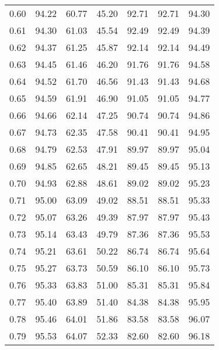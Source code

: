 \begin{tabular}{|c|c|c|c|c|c|c|}
      0.60 &     94.22 &     60.77 &      45.20 &   92.71 &      92.71 &         94.30 \\
      0.61 &     94.30 &     61.03 &      45.54 &   92.49 &      92.49 &         94.39 \\
      0.62 &     94.37 &     61.25 &      45.87 &   92.14 &      92.14 &         94.49 \\
      0.63 &     94.45 &     61.46 &      46.20 &   91.76 &      91.76 &         94.58 \\
      0.64 &     94.52 &     61.70 &      46.56 &   91.43 &      91.43 &         94.68 \\
      0.65 &     94.59 &     61.91 &      46.90 &   91.05 &      91.05 &         94.77 \\
      0.66 &     94.66 &     62.14 &      47.25 &   90.74 &      90.74 &         94.86 \\
      0.67 &     94.73 &     62.35 &      47.58 &   90.41 &      90.41 &         94.95 \\
      0.68 &     94.79 &     62.53 &      47.91 &   89.97 &      89.97 &         95.04 \\
      0.69 &     94.85 &     62.65 &      48.21 &   89.45 &      89.45 &         95.13 \\
      0.70 &     94.93 &     62.88 &      48.61 &   89.02 &      89.02 &         95.23 \\
      0.71 &     95.00 &     63.09 &      49.02 &   88.51 &      88.51 &         95.33 \\
      0.72 &     95.07 &     63.26 &      49.39 &   87.97 &      87.97 &         95.43 \\
      0.73 &     95.14 &     63.43 &      49.79 &   87.36 &      87.36 &         95.53 \\
      0.74 &     95.21 &     63.61 &      50.22 &   86.74 &      86.74 &         95.64 \\
      0.75 &     95.27 &     63.73 &      50.59 &   86.10 &      86.10 &         95.73 \\
      0.76 &     95.33 &     63.83 &      51.00 &   85.31 &      85.31 &         95.84 \\
      0.77 &     95.40 &     63.89 &      51.40 &   84.38 &      84.38 &         95.95 \\
      0.78 &     95.46 &     64.01 &      51.86 &   83.58 &      83.58 &         96.07 \\
      0.79 &     95.53 &     64.07 &      52.33 &   82.60 &      82.60 &         96.18 \\

\end{tabular}
